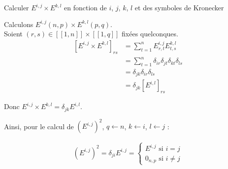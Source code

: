 \documentclass{article}
\renewenvironment{question_kholle}[2][ ]
{
	\subsection{\texorpdfstring{#2}{}}
	\notblank{#1}
	{
		\noindent #1
		\bigbreak
	}
	{}
	\begin{proof}
}
{
	\end{proof}
}
\begin{document}
	{Calculer $E^{i,j} \times E^{k,l}$ en fonction de $i$, $j$, $k$, $l$ et des symboles de Kronecker}

	Calculons $E^{i,j}(n,p) \times E^{k,l}(p,q)$.\\
	Soient $(r, s) \in [ \! [ 1, n] \!] \times [ \! [ 1, q ] \!]$ fixées quelconques.
	\begin{align*}
		\left[ E^{i,j} \times E^{k,l} \right] _{rs}
		 & = \sum_{t = 1}^{n}E^{i,j}_{r,t} E^{k,l}_{t,s}                     \\
		 & =\sum_{t = 1}^{n} \delta_{ir} \delta_{jt} \delta_{kt} \delta_{ls} \\
		 & = \delta_{jk} \delta_{ir} \delta_{ls}                             \\
		 & = \delta_{jk} \left[ E^{i,l} \right] _{rs}
	\end{align*}

	Donc $E^{i,j} \times E^{k,l} = \delta_{jk} E^{i,l}$.


	Ainsi, pour le calcul de $(E^{i,j})^{2}$, $q \leftarrow n$, $k \leftarrow i$, $l \leftarrow j$ :

	\begin{align*}
		(E^{i,j})^{2} = \delta_{ji} E^{i,j} = \left\{
		\begin{array}{ll}
			E^{i,j} \text{ si } i = j \\
			0_{n,p} \text{ si } i \neq j
		\end{array}
		\right.
	\end{align*}

\end{question_kholle}
\end{document}
